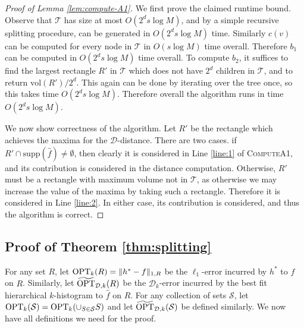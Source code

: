 \documentclass[final,12pt]{colt2018} %
\newcommand{\vol}{\mathrm{vol}}
\newcommand{\supp}{\mathrm{supp}}
\newcommand{\hier}{\mathcal{D}}
\newcommand{\calT}{\mathcal{T}}
\newcommand{\calS}{\mathcal{S}}
\newcommand{\fhat}{\widehat{f}}
\newcommand{\tOPT}{\widetilde{\OPT}}
\begin{document}
\begin{proof}[Proof of Lemma \ref{lem:compute-A1}]
We first prove the claimed runtime bound.
Observe that $\calT$ has size at most $O(2^d s \log M)$, and by a simple recursive splitting procedure, can be generated in $O(2^d s \log M)$ time.
Similarly $c(v)$ can be computed for every node in $\calT$ in $O(s \log M)$ time overall.
Therefore $b_1$ can be computed in $O(2^d s \log M)$ time overall.
To compute $b_2$, it suffices to find the largest rectangle $R'$ in $\calT$ which does not have $2^d$ children in $\calT$, and to return $\vol (R') / 2^d$.
This again can be done by iterating over the tree once, so this takes time $O(2^d s \log M)$.
Therefore overall the algorithm runs in time $O(2^d s \log M)$.

We now show correctness of the algorithm.
Let $R'$ be the rectangle which achieves the maxima for the $\hier$-distance.
There are two cases.
if $R' \cap \supp (\fhat) \neq \emptyset$, then clearly it is considered in Line \ref{line:1} of \textsc{ComputeA1}, and its contribution is considered in the distance computation.
Otherwise, $R'$ must be a rectangle with maximum volume not in $\calT$, as otherwise we may increase the value of the maxima by taking such a rectangle.
Therefore it is considered in Line \ref{line:2}.
In either case, its contribution is considered, and thus the algorithm is correct.
\end{proof}



\subsection{Proof of Theorem \ref{thm:splitting}}
For any set $R$, let $\mathrm{OPT}_{k} (R) = \| h^* - f \|_{1, R}$ be the $\ell_1$-error incurred by $h^*$ to $f$ on $R$.
Similarly, let $\tOPT_{\hier, k} (R)$ be the $\hier_k$-error incurred by the best fit hierarchical $k$-histogram to $\fhat$ on $R$.
For any collection of sets $\calS$, let $\OPT_{k} (\calS) = \OPT_{k} (\cup_{S \in \calS} S)$ and let $\tOPT_{\hier, k} (\calS)$ be defined similarly.
We now have all definitions we need for the proof.
\end{document}
